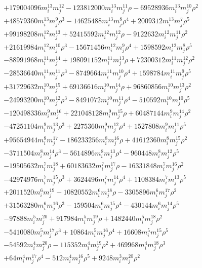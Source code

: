 {\begin{align*}
&+179004096m_i^{13}m_j^{12}-123812000m_i^{13}m_j^{11}\rho-69528936m_i^{13}m_j^{10}\rho^{2}\\
&+48579360m_i^{13}m_j^{9}\rho^{3}-14625488m_i^{13}m_j^{8}\rho^{4}+2009312m_i^{13}m_j^{7}\rho^{5}\\
&+99198208m_i^{12}m_j^{13}+52415592m_i^{12}m_j^{12}\rho-9122632m_i^{12}m_j^{11}\rho^{2}\\
&+21619984m_i^{12}m_j^{10}\rho^{3}-15671456m_i^{12}m_j^{9}\rho^{4}+1598592m_i^{12}m_j^{8}\rho^{5}\\
&-88991968m_i^{11}m_j^{14}+198091152m_i^{11}m_j^{13}\rho+72300312m_i^{11}m_j^{12}\rho^{2}\\
&-28536640m_i^{11}m_j^{11}\rho^{3}-8749664m_i^{11}m_j^{10}\rho^{4}+1598784m_i^{11}m_j^{9}\rho^{5}\\
&+31729632m_i^{10}m_j^{15}+69136616m_i^{10}m_j^{14}\rho+96860856m_i^{10}m_j^{13}\rho^{2}\\
&-24993200m_i^{10}m_j^{12}\rho^{3}-8491072m_i^{10}m_j^{11}\rho^{4}-510592m_i^{10}m_j^{10}\rho^{5}\\
&-120498336m_i^{9}m_j^{16}+221048128m_i^{9}m_j^{15}\rho+60487144m_i^{9}m_j^{14}\rho^{2}\\
&-47251104m_i^{9}m_j^{13}\rho^{3}+2275360m_i^{9}m_j^{12}\rho^{4}+1527808m_i^{9}m_j^{11}\rho^{5}\\
&+95654944m_i^{8}m_j^{17}-186233256m_i^{8}m_j^{16}\rho+41612360m_i^{8}m_j^{15}\rho^{2}\\
&-3711504m_i^{8}m_j^{14}\rho^{3}-5614896m_i^{8}m_j^{13}\rho^{4}-960448m_i^{8}m_j^{12}\rho^{5}\\
&-19505632m_i^{7}m_j^{18}+60183632m_i^{7}m_j^{17}\rho-16331848m_i^{7}m_j^{16}\rho^{2}\\
&-42974976m_i^{7}m_j^{15}\rho^{3}+3624496m_i^{7}m_j^{14}\rho^{4}+1108384m_i^{7}m_j^{13}\rho^{5}\\
&+2011520m_i^{6}m_j^{19}-10820552m_i^{6}m_j^{18}\rho-3305896m_i^{6}m_j^{17}\rho^{2}\\
&+31563280m_i^{6}m_j^{16}\rho^{3}-159504m_i^{6}m_j^{15}\rho^{4}-430144m_i^{6}m_j^{14}\rho^{5}\\
&-97888m_i^{5}m_j^{20}+917984m_i^{5}m_j^{19}\rho+1482440m_i^{5}m_j^{18}\rho^{2}\\
&-5410080m_i^{5}m_j^{17}\rho^{3}+10864m_i^{5}m_j^{16}\rho^{4}+16608m_i^{5}m_j^{15}\rho^{5}\\
&-54592m_i^{4}m_j^{20}\rho-115352m_i^{4}m_j^{19}\rho^{2}+469968m_i^{4}m_j^{18}\rho^{3}\\
&+64m_i^{4}m_j^{17}\rho^{4}-512m_i^{4}m_j^{16}\rho^{5}+9248m_i^{3}m_j^{20}\rho^{2}\\

\end{align*}}
